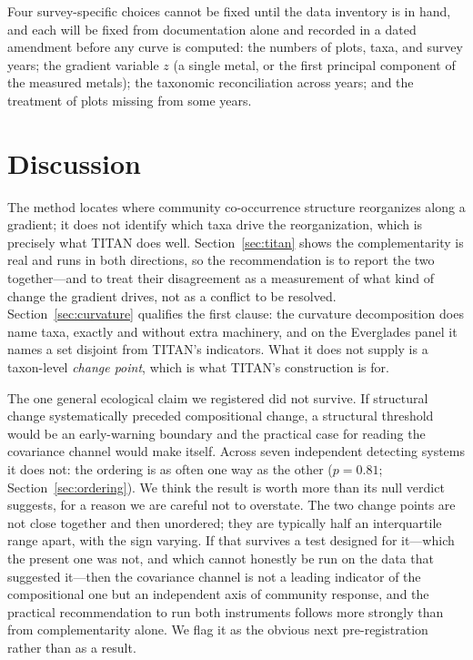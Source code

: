 \documentclass[review,12pt,authoryear]{elsarticle}
\theoremstyle{remark}
\begin{document}
Four survey-specific choices cannot be fixed until the data inventory is in
hand, and each will be fixed from documentation alone and recorded in a
dated amendment before any curve is computed: the numbers of plots, taxa, and
survey years; the gradient variable $z$ (a single metal, or the first
principal component of the measured metals); the taxonomic reconciliation
across years; and the treatment of plots missing from some years.

\section{Discussion}

The method locates where community co-occurrence structure reorganizes along a
gradient; it does not identify which taxa drive the reorganization, which is
precisely what TITAN does well. Section~\ref{sec:titan} shows the
complementarity is real and runs in both directions, so the recommendation is
to report the two together---and to treat their disagreement as a
measurement of what kind of change the gradient drives, not as a conflict to
be resolved. Section~\ref{sec:curvature} qualifies the first clause: the
curvature decomposition does name taxa, exactly and without extra
machinery, and on the Everglades panel it names a set disjoint from TITAN's
indicators. What it does not supply is a taxon-level \emph{change point},
which is what TITAN's construction is for.

The one general ecological claim we registered did not survive. If
structural change systematically preceded compositional change, a
structural threshold would be an early-warning boundary and the practical
case for reading the covariance channel would make itself. Across seven
independent detecting systems it does not: the ordering is as often one way
as the other ($p = 0.81$; Section~\ref{sec:ordering}). We think the result
is worth more than its null verdict suggests, for a reason we are careful
not to overstate. The two change points are not close together and then
unordered; they are typically half an interquartile range apart, with the
sign varying. If that survives a test designed for it---which the present
one was not, and which cannot honestly be run on the data that suggested
it---then the covariance channel is not a leading indicator of the
compositional one but an independent axis of community response, and the
practical recommendation to run both instruments follows more strongly than
from complementarity alone. We flag it as the obvious next pre-registration
rather than as a result.
\end{document}
